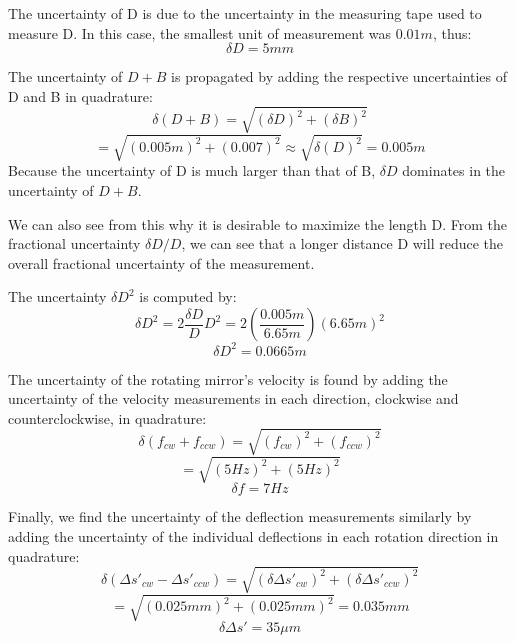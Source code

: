 \documentclass[twocolumn]{article}
\begin{document}
		The uncertainty of D is due to the uncertainty in the measuring tape used to measure D.
		In this case, the smallest unit of measurement was $0.01m$, thus:
		\begin{equation}
			\delta D = 5mm
		\end{equation}
		
		The uncertainty of $D + B$ is propagated by adding the respective uncertainties of D and B in quadrature:
		\begin{equation*}
			\delta (D+B) = \sqrt{(\delta D)^2 + (\delta B)^2}
		\end{equation*}
		\begin{equation*}
		= \sqrt{(0.005m)^2 + (0.007)^2} \approx \sqrt{\delta \left(D\right)^2} = 0.005m
		\end{equation*}
		Because the uncertainty of D is much larger than that of B, $\delta D$ dominates in the uncertainty of $D + B$.
		
		We can also see from this why it is desirable to maximize the length D.
		From the fractional uncertainty $\delta D/D$, we can see that a longer distance D will reduce the overall fractional uncertainty of the measurement.
		
		The uncertainty $\delta D^2$ is computed by:
		\begin{equation*}
			\delta D^2 = 2 \frac{\delta D}{D} D^2 = 2(\frac{0.005m}{6.65m}) (6.65m)^2 
		\end{equation*}
		\begin{equation}
		\delta D^2 = 0.0665m
		\end{equation}
		
		The uncertainty of the rotating mirror's velocity is found by adding the uncertainty of the velocity measurements in each direction, clockwise and counterclockwise, in quadrature:
		\begin{equation}
			\delta \left(f_{cw} + f_{ccw}\right) = \sqrt{(f_{cw})^2 + (f_{ccw})^2}
		\end{equation}
		\begin{equation*}
			= \sqrt{(5Hz)^2 + (5Hz)^2}
		\end{equation*}
		\begin{equation}
			\delta f = 7Hz
		\end{equation}
		
		Finally, we find the uncertainty of the deflection measurements similarly by adding the uncertainty of the individual deflections in each rotation direction in quadrature:
		\begin{equation*}
			\delta(\Delta s'_{cw} - \Delta s'_{ccw}) = \sqrt{(\delta \Delta s'_{cw})^2 + (\delta \Delta s'_{ccw})^2}
		\end{equation*}
		\begin{equation*}
			= \sqrt{(0.025mm)^2 + (0.025mm)^2} = 0.035 mm
		\end{equation*}
		\begin{equation}
			\delta \Delta s' = 35\mu m
		\end{equation}
		
\end{document}
